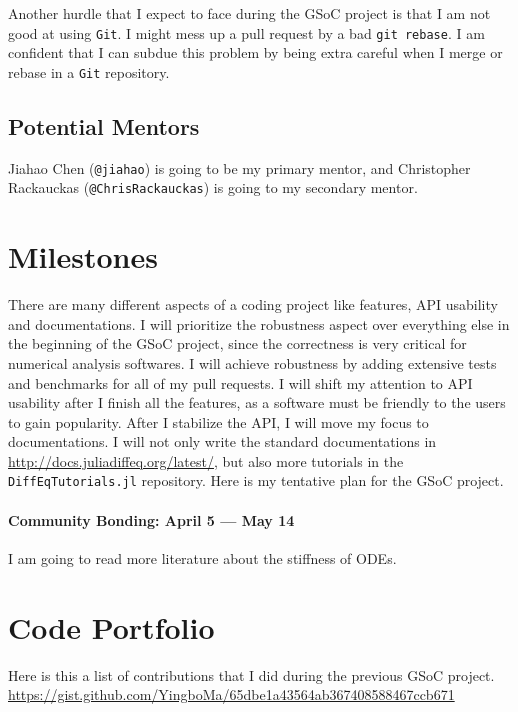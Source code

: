 \documentclass[12pt]{article}
\begin{document}
Another hurdle that I expect to face during the GSoC project is that I am not
good at using \texttt{Git}. I might mess up a pull request by a bad \texttt{git
rebase}. I am confident that I can subdue this problem by being extra careful
when I merge or rebase in a \texttt{Git} repository.

\subsection{Potential Mentors}
Jiahao Chen (\texttt{@jiahao}) is going to be my primary mentor, and
Christopher Rackauckas (\texttt{@ChrisRackauckas}) is going to my secondary
mentor.

\section{Milestones}
There are many different aspects of a coding project like features, API
usability and documentations. I will prioritize the robustness aspect over
everything else in the beginning of the GSoC project, since the correctness is
very critical for numerical analysis softwares. I will achieve robustness by
adding extensive tests and benchmarks for all of my pull requests. I will shift
my attention to API usability after I finish all the features, as a software
must be friendly to the users to gain popularity. After I stabilize the API, I
will move my focus to documentations. I will not only write the standard
documentations in \url{http://docs.juliadiffeq.org/latest/}, but also more
tutorials in the \texttt{DiffEqTutorials.jl} repository. Here is my tentative
plan for the GSoC project.



\paragraph{Community Bonding: April 5 --- May 14}
I am going to read more literature about the stiffness of ODEs.

\section{Code Portfolio}
Here is this a list of contributions that I did during the previous GSoC
project.
\url{https://gist.github.com/YingboMa/65dbe1a43564ab367408588467ccb671}
\end{document}
